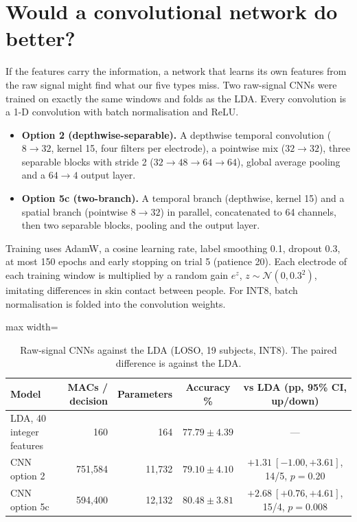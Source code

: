 \documentclass[11pt,a4paper]{article}
\newcommand{\hl}{\rowcolor{chosen}}
\begin{document}
\section{Would a convolutional network do better?}\label{sec:cnn}
If the features carry the information, a network that learns its own features from the raw signal might find
what our five types miss. Two raw-signal CNNs were trained on exactly the same windows and folds as the LDA.
Every convolution is a 1-D convolution with batch normalisation and ReLU.
\begin{itemize}
\item \textbf{Option 2 (depthwise-separable).} A depthwise temporal convolution ($8\to32$, kernel 15, four
filters per electrode), a pointwise mix ($32\to32$), three separable blocks with stride 2
($32\to48\to64\to64$), global average pooling and a $64\to4$ output layer.
\item \textbf{Option 5c (two-branch).} A temporal branch (depthwise, kernel 15) and a spatial branch
(pointwise $8\to32$) in parallel, concatenated to 64 channels, then two separable blocks, pooling and the
output layer.
\end{itemize}
Training uses AdamW, a cosine learning rate, label smoothing 0.1, dropout 0.3, at most 150 epochs and early
stopping on trial 5 (patience 20). Each electrode of each training window is multiplied by a random gain
$e^{z}$, $z\sim\mathcal{N}(0,0.3^2)$, imitating differences in skin contact between people. For INT8, batch
normalisation is folded into the convolution weights.

\begin{table}[t]\centering\small
\caption{Raw-signal CNNs against the LDA (LOSO, 19 subjects, INT8). The paired difference is against the LDA.}
\label{tab:cnn}
\begin{adjustbox}{max width=\textwidth}
\begin{tabular}{lrrcc}\toprule
Model & MACs / decision & Parameters & Accuracy \% & vs LDA (pp, 95\% CI, up/down)\\\midrule
\hl LDA, 40 integer features & 160 & 164 & $77.79\pm4.39$ & ---\\
CNN option 2 & 751{,}584 & 11{,}732 & $79.10\pm4.10$ & $+1.31\ [-1.00,+3.61]$, 14/5, $p=0.20$\\
CNN option 5c & 594{,}400 & 12{,}132 & $80.48\pm3.81$ & $+2.68\ [+0.76,+4.61]$, 15/4, $p=0.008$\\\bottomrule
\end{tabular}
\end{adjustbox}
\end{table}
\end{document}
